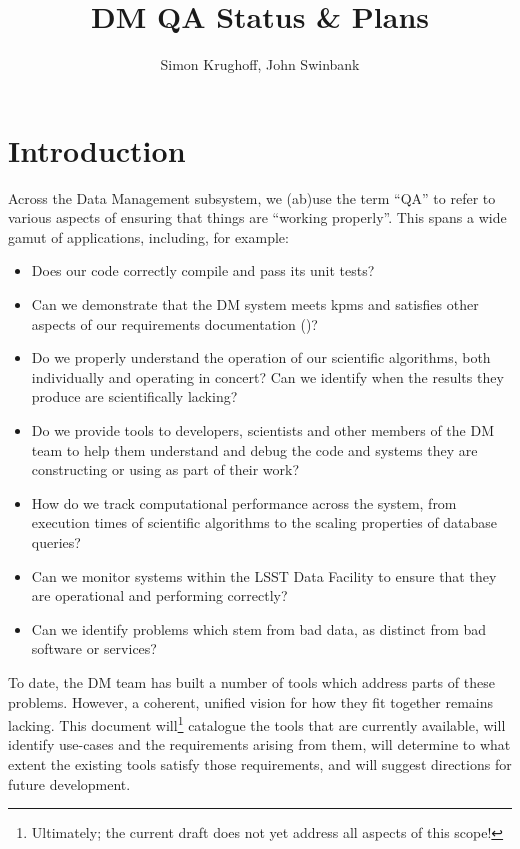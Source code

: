 \documentclass[DM,authoryear,toc,lsstdraft]{lsstdoc}
\title{DM QA Status \& Plans}
\author{%
Simon Krughoff,
John Swinbank
}
\date{\vcsDate}
\begin{document}
\maketitle

\section{Introduction}
\label{sec:intro}

Across the Data Management subsystem, we (ab)use the term ``QA'' to refer to
various aspects of ensuring that things are ``working properly''. This spans a
wide gamut of applications, including, for example:

\begin{itemize}

\item{Does our code correctly compile and pass its unit tests?}
\item{Can we demonstrate that the DM system meets \glspl{kpm} and satisfies
other aspects of our requirements documentation ()?}
\item{Do we properly understand the operation of our scientific algorithms,
both individually and operating in concert? Can we identify when the results
they produce are scientifically lacking?}
\item{Do we provide tools to developers, scientists and other members of the
DM team to help them understand and debug the code and systems they are
constructing or using as part of their work?}
\item{How do we track computational performance across the system, from
execution times of scientific algorithms to the scaling properties of database
queries?}
\item{Can we monitor systems within the LSST Data Facility to ensure that they
are operational and performing correctly?}
\item{Can we identify problems which stem from bad data, as distinct from bad
software or services?}

\end{itemize}

To date, the DM team has built a number of tools which address parts of these
problems. However, a coherent, unified vision for how they fit together
remains lacking. This document will\footnote{Ultimately; the current draft
does not yet address all aspects of this scope!} catalogue the tools that are currently
available, will identify use-cases and the requirements arising from them,
will determine to what extent the existing tools satisfy those requirements,
and will suggest directions for future development.
\end{document}
